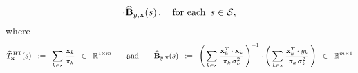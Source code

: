 \begin{definition}
\begin{equation*}
	\cdot
	\widehat{\mathbf{B}}_{y,\mathbf{x}}(s)\,,
	\quad\textnormal{for each \,$s \in \mathcal{S}$},
\end{equation*}
where
\begin{equation*}
\widehat{T}^{\,\textnormal{HT}}_{\mathbf{x}}(s)
\;\; := \;\;
	\underset{k \in s}{\sum}\;\dfrac{\mathbf{x}_{k}}{\pi_{k}}
	\;\; \in \;\;
	\Re^{1 \times m}
\quad\quad\textnormal{and}\quad\quad
\widehat{\mathbf{B}}_{y,\mathbf{x}}(s)
\;\; := \;\;
	\left(\,\underset{k \in s}{\sum}\;\dfrac{\mathbf{x}_{k}^{T} \cdot \mathbf{x}_{k}}{\pi_{k}\,\sigma_{k}^{2}} \,\right)^{-1}
	\cdot
	\left(\,\underset{k \in s}{\sum}\;\dfrac{\mathbf{x}_{k}^{T} \cdot y_{k}}{\pi_{k}\,\sigma_{k}^{2}} \,\right)
	\;\; \in \;\;
	\Re^{m \times 1}
\end{equation*}
\end{definition}


